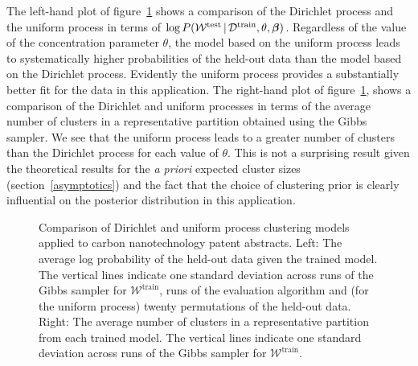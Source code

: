 \documentclass{article}
\begin{document}
The left-hand plot of figure~\ref{resultsfig} shows a comparison of
the Dirichlet process and the uniform process in terms of
$\log{P(\mathcal{W}^{\textrm{test}} \,|\,\mathcal{D}^{\textrm{train}},
  \theta, \boldsymbol{\beta})}$. Regardless of the value of the concentration
parameter $\theta$, the model based on the uniform process leads to
systematically higher probabilities of the held-out data than the
model based on the Dirichlet process. Evidently the uniform process
provides a substantially better fit for the data in this application.
The right-hand plot of figure~\ref{resultsfig}, shows a comparison of
the Dirichlet and uniform processes in terms of the average number of
clusters in a representative partition obtained using the Gibbs
sampler.  We see that the uniform process leads to a greater number of
clusters than the Dirichlet process for each value of $\theta$.  This
is not a surprising result given the theoretical results for the {\it
  a priori} expected cluster sizes (section~\ref{asymptotics}) and the
fact that the choice of clustering prior is clearly influential on the
posterior distribution in this application.
\begin{figure}[t]
\vspace{-0.25cm}
\centering
{}
\caption{Comparison of Dirichlet and uniform process clustering models
  applied to carbon nanotechnology patent abstracts. Left: The average log
  probability of the held-out data given the trained model. The
  vertical lines indicate one standard deviation across runs of the
  Gibbs sampler for $\mathcal{W}^{\textrm{train}}$, runs of the
  evaluation algorithm and (for the uniform process) twenty
  permutations of the held-out data. Right: The average number of clusters
  in a representative partition from each trained model. The vertical
  lines indicate one standard deviation across runs of the Gibbs
  sampler for $\mathcal{W}^{\textrm{train}}$.}\label{resultsfig}
\vspace{-0.4cm}
\end{figure}
\end{document}
